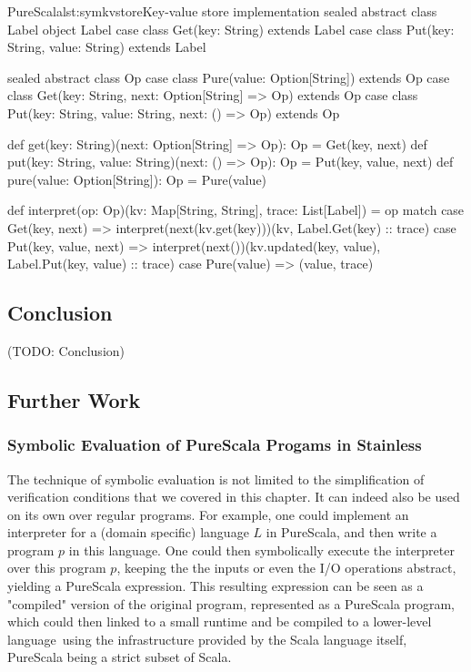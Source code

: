 \documentclass[a4paper,twoside]{article}
\newcommand{\TODO}[1]{\textcolor{YellowOrange}{(TODO: #1)}} %
\begin{document}
\begin{Code}{PureScala}{lst:symkvstore}{Key-value store implementation}
sealed abstract class Label
object Label {
  case class Get(key: String) extends Label
  case class Put(key: String, value: String) extends Label
}

sealed abstract class Op
case class Pure(value: Option[String]) extends Op
case class Get(key: String, next: Option[String] => Op) extends Op
case class Put(key: String, value: String, next: () => Op) extends Op

def get(key: String)(next: Option[String] => Op): Op = Get(key, next)
def put(key: String, value: String)(next: () => Op): Op = Put(key, value, next)
def pure(value: Option[String]): Op = Pure(value)

def interpret(op: Op)(kv: Map[String, String], trace: List[Label]) = op match {
  case Get(key, next) =>
  	interpret(next(kv.get(key)))(kv, Label.Get(key) :: trace)
  case Put(key, value, next) =>
  	interpret(next())(kv.updated(key, value), Label.Put(key, value) :: trace)
  case Pure(value) =>
  	(value, trace)
}
\end{Code}

\subsection{Conclusion}

\TODO{Conclusion}

\subsection{Further Work}

\subsubsection*{Symbolic Evaluation of PureScala Progams in Stainless}

The technique of symbolic evaluation is not limited to the simplification of verification conditions that we covered in this chapter. It can indeed also be used on its own over regular programs. For example, one could implement an interpreter for a (domain specific) language $L$ in PureScala, and then write a program $p$ in this language. One could then symbolically execute the interpreter  over this program $p$, keeping the the inputs or even the I/O operations abstract, yielding a PureScala expression. This resulting expression can be seen as a "compiled" version of the original program, represented as a PureScala program, which could then linked to a small runtime and be compiled to a lower-level language using the infrastructure provided by the Scala language itself, PureScala being a strict subset of Scala.\\
\end{document}
